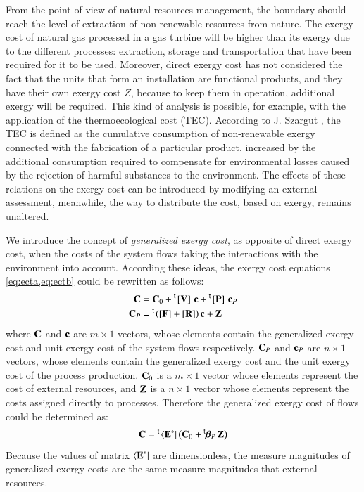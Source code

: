 \documentclass{ecos}
\begin{document}
From the point of view of natural resources management, the boundary should reach the level of extraction of non-renewable resources from nature. The exergy cost of natural gas processed in a gas turbine will be higher than its exergy due to the different processes: extraction, storage and transportation that have been required for it to be used.  Moreover, direct exergy cost has not considered the fact that the units that form an installation are functional products, and they have their own exergy cost $Z$, because to keep them in operation, additional exergy will be required.   
This kind of analysis is possible, for example, with the application of the thermoecological cost (TEC). According to J. Szargut \cite{Szargut2005}, the TEC is defined as the cumulative consumption of non-renewable exergy connected with the fabrication of a particular product, increased by the additional consumption required to compensate for environmental losses caused by the rejection of harmful substances to the environment. The effects of these relations on the exergy cost can be introduced by modifying an external assessment, meanwhile, the way to distribute the cost, based on exergy, remains unaltered.

We introduce the concept of \emph{generalized exergy cost}, as opposite of direct exergy cost, when the costs of the system flows taking the interactions with the environment into account.
According these ideas, the exergy cost equations \cref{eq:ecta,eq:ectb} could be rewritten as follows:
\begin{align}
\mathbf{C}&=\mathbf{C}_0+\prescript{\smash{\mathsf{t}}}{}{\mskip-1mu}\left[ \textbf{V} \right]\,\mathbf{c}+\prescript{\smash{\mathsf{t}}}{}{\mskip-1mu}\left[ \textbf{P} \right]\,\mathbf{c}_{P}\label{eq:gecta}\\
\mathbf{C}_{P}&=\prescript{\smash{\mathsf{t}}}{}{\mskip-1mu}\left([\mathbf{F}]+[\mathbf{R}]\right)\mathbf{c}+\mathbf{Z}\label{eq:gectb}
\end{align}
where $\mathbf{C}$ and $\mathbf{c}$ are $m\times 1$ vectors, whose elements contain the generalized exergy cost and unit exergy cost of the system flows respectively. $\mathbf{C}_{P}$ and $\mathbf{c}_{P}$ are $n \times1$ vectors, whose elements contain the generalized exergy cost and the unit exergy cost of the process production. $\mathbf{C}_0$ is a $m\times 1$ vector whose elements represent the cost of external resources, and $\mathbf{Z}$ is a $n\times 1$ vector whose elements represent the costs assigned directly to processes.
Therefore the generalized exergy cost of flows could be determined as:
\begin{equation}
\mathbf{C}=\prescript{\smash{\mathsf{t}}}{}{\mskip-1mu}\left\langle {\textbf{E}^\ast } \right|\left( \mathbf{C}_0 + \prescript{\smash{\mathsf{t}}}{}{\mskip-1mu}\bm{\beta}_P\,\mathbf{Z}\right )
\end{equation}
Because the values of matrix $\left\langle {\textbf{E}^\ast } \right|$ are dimensionless, the measure magnitudes of generalized exergy costs are the same measure magnitudes that external resources.
\end{document}
